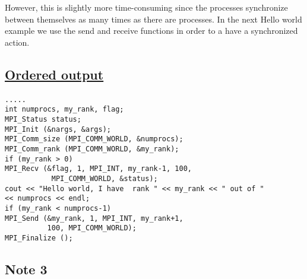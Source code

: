 \documentclass[%
oneside,                 %
final,                   %
10pt]{article}
\begin{document}
\noindent
However, this is slightly more time-consuming since the processes synchronize between themselves as many times as there
are processes.  In the next Hello world example we use the send and receive functions in order to a have a synchronized
action.



\subsection*{\href{{https://github.com/CompPhysics/ComputationalPhysics2/blob/gh-pages/doc/Programs/LecturePrograms/programs/MPI/chapter07/program4.cpp}}{Ordered output}}

\paragraph{}

















\begin{Verbatim}[numbers=none,fontsize=\fontsize{9pt}{9pt},baselinestretch=0.95]
.....
int numprocs, my_rank, flag;
MPI_Status status;
MPI_Init (&nargs, &args);
MPI_Comm_size (MPI_COMM_WORLD, &numprocs);
MPI_Comm_rank (MPI_COMM_WORLD, &my_rank);
if (my_rank > 0)
MPI_Recv (&flag, 1, MPI_INT, my_rank-1, 100, 
           MPI_COMM_WORLD, &status);
cout << "Hello world, I have  rank " << my_rank << " out of " 
<< numprocs << endl;
if (my_rank < numprocs-1)
MPI_Send (&my_rank, 1, MPI_INT, my_rank+1, 
          100, MPI_COMM_WORLD);
MPI_Finalize ();

\end{Verbatim}



\subsection*{Note 3}

\paragraph{}
\end{document}
